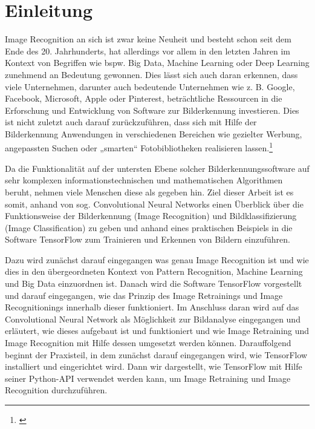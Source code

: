 \section{Einleitung}
\label{sec:Einleitung}
Image Recognition an sich ist zwar keine Neuheit und besteht schon seit dem Ende des 20. Jahrhunderts, hat allerdings vor allem in den letzten Jahren im Kontext von Begriffen wie bspw. Big Data, Machine Learning oder Deep Learning zunehmend an Bedeutung gewonnen. Dies lässt sich auch daran erkennen, dass viele Unternehmen, darunter auch bedeutende Unternehmen wie z. B. Google, Facebook, Microsoft, Apple oder Pinterest, beträchtliche Ressourcen in die Erforschung und Entwicklung von Software zur Bilderkennung investieren. Dies ist nicht zuletzt auch darauf zurückzuführen, dass sich mit Hilfe der Bilderkennung Anwendungen in verschiedenen Bereichen wie gezielter Werbung, angepassten Suchen oder „smarten“ Fotobibliotheken realisieren lassen.\footnote{\cite{ImageRecognition}}

Da die Funktionalität auf der untersten Ebene solcher Bilderkennungssoftware auf sehr komplexen informationstechnischen und mathematischen Algorithmen beruht, nehmen viele Menschen diese als gegeben hin. Ziel dieser Arbeit ist es somit, anhand von sog. Convolutional Neural Networks einen Überblick über die Funktionsweise der Bilderkennung (Image Recognition) und Bildklassifizierung (Image Classification) zu geben und anhand eines praktischen Beispiels in die Software TensorFlow zum Trainieren und Erkennen von Bildern einzuführen.

Dazu wird zunächst darauf eingegangen was genau Image Recognition ist und wie dies in den übergeordneten Kontext von Pattern Recognition, Machine Learning und Big Data einzuordnen ist. Danach wird die Software TensorFlow vorgestellt und darauf eingegangen, wie das Prinzip des Image Retrainings und Image Recognitionings innerhalb dieser funktioniert. Im Anschluss daran wird auf das Convolutional Neural Network als Möglichkeit zur Bildanalyse eingegangen und erläutert, wie dieses aufgebaut ist und funktioniert und wie Image Retraining und Image Recognition mit Hilfe dessen umgesetzt werden können. Darauffolgend beginnt der Praxisteil, in dem zunächst darauf eingegangen wird, wie TensorFlow installiert und eingerichtet wird. Dann wir dargestellt, wie TensorFlow mit Hilfe seiner Python-API verwendet werden kann, um Image Retraining und Image Recognition durchzuführen.
